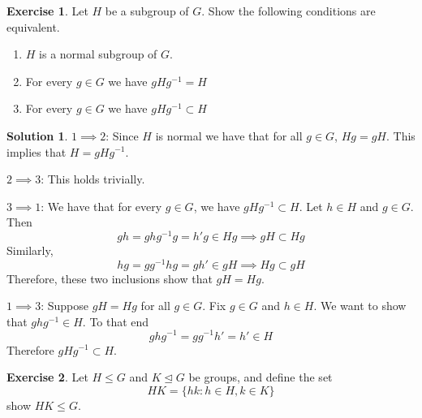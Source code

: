 \documentclass[12pt]{article}
\theoremstyle{definition}
\newtheorem{exercise}{Exercise}
\theoremstyle{definition}
\newtheorem{solution}{Solution}
\begin{document}
\begin{exercise}
Let $H$ be a subgroup of $G$. Show the following conditions are equivalent.
\begin{enumerate}
	\item $H$ is a normal subgroup of $G$.
	\item For every $g \in G$ we have $gHg^{-1} = H$
	\item For every $g \in G$ we have $gHg^{-1} \subset H$
\end{enumerate}
\end{exercise}
\begin{solution} 
$1 \implies 2$: Since $H$ is normal we have that for all $g \in G$, $Hg = gH$. This implies that $H = gH g^{-1}$.

$2 \implies 3$: This holds trivially.

$3 \implies 1$: We have that for every $g \in G$, we have $gHg^{-1} \subset H$. Let $h \in H$ and $g \in G$. Then 
\begin{equation}
	gh = ghg^{-1}g = h'g \in Hg \implies gH \subset Hg 	
\end{equation} 
Similarly,
\begin{equation}
	hg = gg^{-1}hg = gh' \in gH \implies Hg \subset gH
\end{equation}
Therefore, these two inclusions show that $gH = Hg$. 

$1 \implies 3$: Suppose $gH = Hg$ for all $g \in G$. Fix $g \in G$ and $h \in H$. We want to show that $ghg^{-1} \in H$. To that end
\begin{equation}
	ghg^{-1} = gg^{-1}h' = h' \in H
\end{equation}
Therefore $gHg^{-1} \subset H$.
\end{solution}


\begin{exercise}
Let $H \leq G$ and $K \trianglelefteq G$ be groups, and define the set
\begin{equation}
	HK = \{ hk : h \in H, k \in K \}
\end{equation}
show $HK \leq G$.
\end{exercise}
\end{document}
